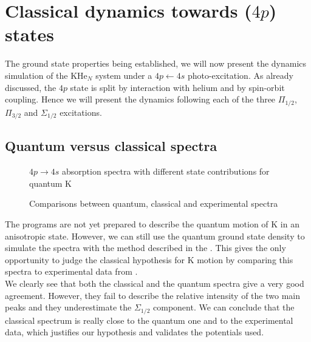 \section{Classical dynamics towards ($4p$) states}

The ground state properties being established, we will now present the dynamics simulation of the KHe$_N$ system under a $4p\leftarrow 4s$ photo-excitation. 
As already discussed, the $4p$ state is split by interaction with helium and by spin-orbit coupling.
Hence we will present the dynamics following each of the three $\Pi_{1/2}$, $\Pi_{3/2}$ and $\Sigma_{1/2}$ excitations.

\subsection{Quantum versus classical spectra}
\label{sec:4P-spectra}

\begin{figure}[h!]
	\centering
	\begin{minipage}[c]{0.48\linewidth}
		
		\label{fig:4P-sp-Q}
		\vspace{0.2\baselineskip}
		\caption{$4p\rightarrow 4s$ absorption spectra with different state contributions for quantum K}
	\end{minipage}
\hfill
	\begin{minipage}[c]{0.48\linewidth}
		
		\label{fig:4P-sp-QC}
		\vspace{0.2\baselineskip}
		\caption{Comparisons between quantum, classical and experimental spectra \cite{Sti1996}}
	\end{minipage}
\end{figure}

The programs are not yet prepared to describe the quantum motion of K in an anisotropic state.
However, we can still use the quantum ground state density to simulate the spectra with the method described in the  .
This gives the only opportunity to judge the classical hypothesis for K motion by comparing this spectra to experimental data from \cite{Sti1996}.\\

We clearly see that both the classical and the quantum spectra give a very good agreement.
However,  they fail to describe the relative intensity of the two main peaks and they underestimate the $\Sigma_{1/2}$ component. 
We can conclude that the classical spectrum is really close to the quantum one and to the experimental data, which justifies our hypothesis and validates the potentials used.


